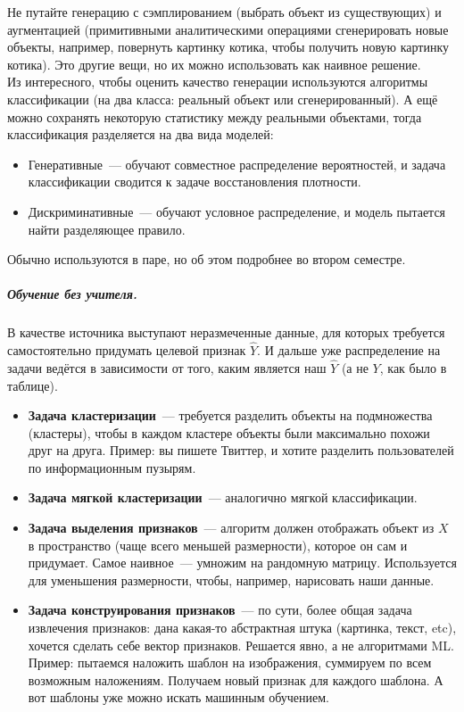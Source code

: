 \documentclass{article}
\begin{document}
    Не путайте генерацию с сэмплированием (выбрать объект из существующих) и аугментацией (примитивными аналитическими операциями сгенерировать новые объекты, например, повернуть картинку котика, чтобы получить новую картинку котика). Это другие вещи, но их можно использовать как наивное решение.\\
    Из интересного, чтобы оценить качество генерации используются алгоритмы классификации (на два класса: реальный объект или сгенерированный). А ещё можно сохранять некоторую статистику между реальными объектами, тогда классификация разделяется на два вида моделей:
    \begin{itemize}
        \item Генеративные~--- обучают совместное распределение вероятностей, и задача классификации сводится к задаче восстановления плотности.
        \item Дискриминативные~--- обучают условное распределение, и модель пытается найти разделяющее правило.
    \end{itemize}
    Обычно используются в паре, но об этом подробнее во втором семестре.
    \subparagraph{Обучение без учителя.}
    В качестве источника выступают неразмеченные данные, для которых требуется самостоятельно придумать целевой признак $\widehat Y$. И дальше уже распределение на задачи ведётся в зависимости от того, каким является наш $\widehat Y$ (а не $Y$, как было в таблице).
    \begin{itemize}
        \item \textbf{Задача кластеризации}~--- требуется разделить объекты на подмножества (кластеры), чтобы в каждом кластере объекты были максимально похожи друг на друга. Пример: вы пишете Твиттер, и хотите разделить пользователей по информационным пузырям.
        \item \textbf{Задача мягкой кластеризации}~--- аналогично мягкой классификации.
        \item \textbf{Задача выделения признаков}~--- алгоритм должен отображать объект из $X$ в пространство (чаще всего меньшей размерности), которое он сам и придумает. Самое наивное~--- умножим на рандомную матрицу. Используется для уменьшения размерности, чтобы, например, нарисовать наши данные.
        \item \textbf{Задача конструирования признаков}~--- по сути, более общая задача извлечения признаков: дана какая-то абстрактная штука (картинка, текст, etc), хочется сделать себе вектор признаков. Решается явно, а не алгоритмами ML. Пример: пытаемся наложить шаблон на изображения, суммируем по всем возможным наложениям. Получаем новый признак для каждого шаблона. А вот шаблоны уже можно искать машинным обучением.
    \end{itemize}
\end{document}
